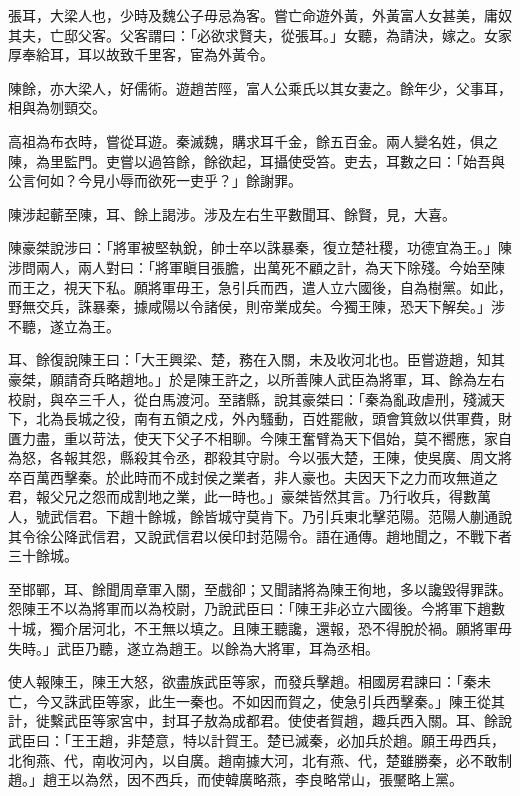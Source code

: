
\begin{pinyinscope}
張耳，大梁人也，少時及魏公子毋忌為客。嘗亡命遊外黃，外黃富人女甚美，庸奴其夫，亡邸父客。父客謂曰：「必欲求賢夫，從張耳。」女聽，為請決，嫁之。女家厚奉給耳，耳以故致千里客，宦為外黃令。

陳餘，亦大梁人，好儒術。遊趙苦陘，富人公乘氏以其女妻之。餘年少，父事耳，相與為刎頸交。

高祖為布衣時，嘗從耳遊。秦滅魏，購求耳千金，餘五百金。兩人變名姓，俱之陳，為里監門。吏嘗以過笞餘，餘欲起，耳攝使受笞。吏去，耳數之曰：「始吾與公言何如？今見小辱而欲死一吏乎？」餘謝罪。

陳涉起蘄至陳，耳、餘上謁涉。涉及左右生平數聞耳、餘賢，見，大喜。

陳豪桀說涉曰：「將軍被堅執銳，帥士卒以誅暴秦，復立楚社稷，功德宜為王。」陳涉問兩人，兩人對曰：「將軍瞋目張膽，出萬死不顧之計，為天下除殘。今始至陳而王之，視天下私。願將軍毋王，急引兵而西，遣人立六國後，自為樹黨。如此，野無交兵，誅暴秦，據咸陽以令諸侯，則帝業成矣。今獨王陳，恐天下解矣。」涉不聽，遂立為王。

耳、餘復說陳王曰：「大王興梁、楚，務在入關，未及收河北也。臣嘗遊趙，知其豪桀，願請奇兵略趙地。」於是陳王許之，以所善陳人武臣為將軍，耳、餘為左右校尉，與卒三千人，從白馬渡河。至諸縣，說其豪桀曰：「秦為亂政虐刑，殘滅天下，北為長城之役，南有五領之戍，外內騷動，百姓罷敝，頭會箕斂以供軍費，財匱力盡，重以苛法，使天下父子不相聊。今陳王奮臂為天下倡始，莫不嚮應，家自為怒，各報其怨，縣殺其令丞，郡殺其守尉。今以張大楚，王陳，使吳廣、周文將卒百萬西擊秦。於此時而不成封侯之業者，非人豪也。夫因天下之力而攻無道之君，報父兄之怨而成割地之業，此一時也。」豪桀皆然其言。乃行收兵，得數萬人，號武信君。下趙十餘城，餘皆城守莫肯下。乃引兵東北擊范陽。范陽人蒯通說其令徐公降武信君，又說武信君以侯印封范陽令。語在通傳。趙地聞之，不戰下者三十餘城。

至邯鄲，耳、餘聞周章軍入關，至戲卻；又聞諸將為陳王徇地，多以讒毀得罪誅。怨陳王不以為將軍而以為校尉，乃說武臣曰：「陳王非必立六國後。今將軍下趙數十城，獨介居河北，不王無以填之。且陳王聽讒，還報，恐不得脫於禍。願將軍毋失時。」武臣乃聽，遂立為趙王。以餘為大將軍，耳為丞相。

使人報陳王，陳王大怒，欲盡族武臣等家，而發兵擊趙。相國房君諫曰：「秦未亡，今又誅武臣等家，此生一秦也。不如因而賀之，使急引兵西擊秦。」陳王從其計，徙繫武臣等家宮中，封耳子敖為成都君。使使者賀趙，趣兵西入關。耳、餘說武臣曰：「王王趙，非楚意，特以計賀王。楚已滅秦，必加兵於趙。願王毋西兵，北徇燕、代，南收河內，以自廣。趙南據大河，北有燕、代，楚雖勝秦，必不敢制趙。」趙王以為然，因不西兵，而使韓廣略燕，李良略常山，張黶略上黨。


\end{pinyinscope}
